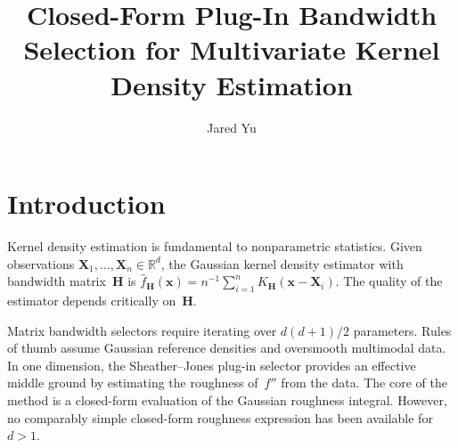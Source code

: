 \documentclass[numsec,webpdf,modern,medium,namedate]{oup-authoring-template}
\theoremstyle{thmstyleone}
\theoremstyle{thmstyletwo}
\theoremstyle{thmstylethree}
\def\authormark#1{\markboth{#1}{#1}}
\newcommand{\R}{\mathbb{R}}
\newcommand{\bx}{\bm{x}}
\newcommand{\bX}{\bm{X}}
\begin{document}


\title[Closed-Form Plug-In Bandwidth for Multivariate KDE]{Closed-Form Plug-In Bandwidth Selection for Multivariate Kernel Density Estimation}

\providecommand{\ORCID}[1]{}
\author[1,$\ast$]{Jared Yu}

\authormark{Yu}

\address[1]{, }





\providecommand{\access}[1]{}
\providecommand{\appnotes}[1]{}

\maketitle


\section{Introduction}\label{sec:intro}

Kernel density estimation is fundamental to nonparametric statistics. Given observations $\bX_1, \ldots, \bX_n \in \R^d$, the Gaussian kernel density estimator with bandwidth matrix~$\bm{H}$ is $\hat{f}_{\bm{H}}(\bx) = n^{-1} \sum_{i=1}^n K_{\bm{H}}(\bx - \bX_i)$. The quality of the estimator depends critically on~$\bm{H}$.

Matrix bandwidth selectors \citep{duong2003,chacon2010} require iterating over $d(d+1)/2$ parameters. Rules of thumb \citep{scott1992,silverman1986} assume Gaussian reference densities and oversmooth multimodal data. In one dimension, the Sheather--Jones plug-in selector \citep{sheather1991} provides an effective middle ground by estimating the roughness of~$f''$ from the data. The core of the method is a closed-form evaluation of the Gaussian roughness integral. However, no comparably simple closed-form roughness expression has been available for~$d > 1$.
\end{document}
